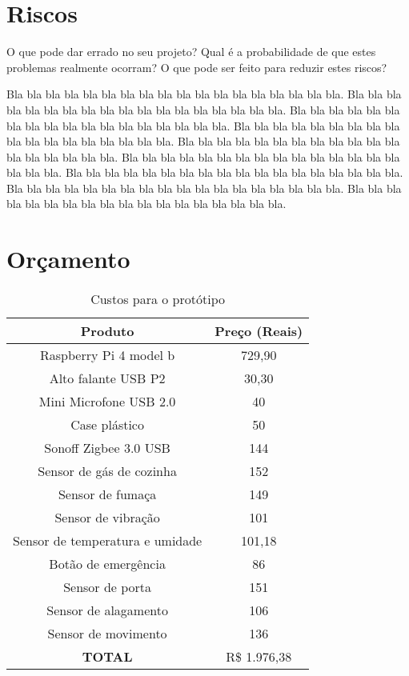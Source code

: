\documentclass{acm_proc_article-sp}
\begin{document}
\section{Riscos}

O que pode dar errado no seu projeto?
Qual é a probabilidade de que estes problemas realmente ocorram?
O que pode ser feito para reduzir estes riscos?

Bla bla bla bla bla bla bla bla bla bla bla bla bla bla bla bla bla bla.
Bla bla bla bla bla bla bla bla bla bla bla bla bla bla bla bla bla bla.
Bla bla bla bla bla bla bla bla bla bla bla bla bla bla bla bla bla bla.
Bla bla bla bla bla bla bla bla bla bla bla bla bla bla bla bla bla bla.
Bla bla bla bla bla bla bla bla bla bla bla bla bla bla bla bla bla bla.
Bla bla bla bla bla bla bla bla bla bla bla bla bla bla bla bla bla bla.
Bla bla bla bla bla bla bla bla bla bla bla bla bla bla bla bla bla bla.
Bla bla bla bla bla bla bla bla bla bla bla bla bla bla bla bla bla bla.
Bla bla bla bla bla bla bla bla bla bla bla bla bla bla bla bla bla bla.


\section{Orçamento}

\begin{table}[!h]
\ABNTEXfontereduzida
\centering
\caption{Custos para o protótipo}
\begin{tabular}{cc}
\hline
\textbf{Produto}                & \textbf{Preço (Reais)} \\ \hline
Raspberry Pi 4 model b          & 729,90                 \\
Alto falante USB P2             & 30,30                  \\
Mini Microfone USB 2.0          & 40                     \\
Case plástico                   & 50                     \\
Sonoff Zigbee 3.0 USB           & 144                    \\
Sensor de gás de cozinha        & 152                    \\
Sensor de fumaça                & 149                    \\
Sensor de vibração              & 101                    \\
Sensor de temperatura e umidade & 101,18                 \\
Botão de emergência             & 86                     \\
Sensor de porta                 & 151                    \\
Sensor de alagamento            & 106                    \\
Sensor de movimento             & 136                    \\ \hline
\textbf{TOTAL}                  & R\$ 1.976,38           \\ \hline
\end{tabular}
\fonteproprioautor

\end{table}
\end{document}
